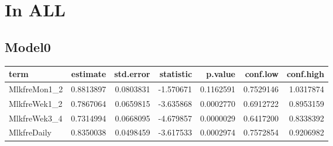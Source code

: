\documentclass[
]{article}
\newenvironment{Shaded}{\begin{snugshade}}{\end{snugshade}}
\newcommand{\DataTypeTok}[1]{\textcolor[rgb]{0.13,0.29,0.53}{#1}}
\newcommand{\KeywordTok}[1]{\textcolor[rgb]{0.13,0.29,0.53}{\textbf{#1}}}
\newcommand{\NormalTok}[1]{#1}
\newcommand{\OperatorTok}[1]{\textcolor[rgb]{0.81,0.36,0.00}{\textbf{#1}}}
\newcommand{\OtherTok}[1]{\textcolor[rgb]{0.56,0.35,0.01}{#1}}
\newcommand{\StringTok}[1]{\textcolor[rgb]{0.31,0.60,0.02}{#1}}
\begin{document}
\hypertarget{in-all}{%
\section{In ALL}\label{in-all}}

\hypertarget{model0}{%
\subsection{Model0}\label{model0}}

\begin{Shaded}
\end{Shaded}

\begin{longtable}[]{@{}lrrrrrr@{}}
\toprule
term & estimate & std.error & statistic & p.value & conf.low &
conf.high\tabularnewline
\midrule
\endhead
MlkfreMon1\_2 & 0.8813897 & 0.0803831 & -1.570671 & 0.1162591 &
0.7529146 & 1.0317874\tabularnewline
MlkfreWek1\_2 & 0.7867064 & 0.0659815 & -3.635868 & 0.0002770 &
0.6912722 & 0.8953159\tabularnewline
MlkfreWek3\_4 & 0.7314994 & 0.0668095 & -4.679857 & 0.0000029 &
0.6417200 & 0.8338392\tabularnewline
MlkfreDaily & 0.8350038 & 0.0498459 & -3.617533 & 0.0002974 & 0.7572854
& 0.9206982\tabularnewline
\bottomrule
\end{longtable}

\begin{Shaded}
\end{Shaded}
\end{document}
